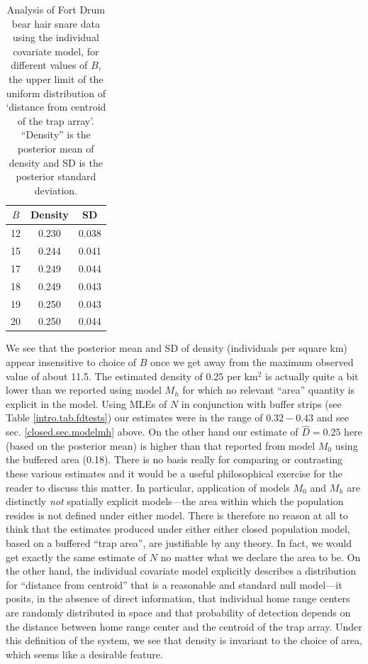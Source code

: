 \begin{table}[htp]
\centering
\caption{Analysis of Fort Drum bear hair snare data using the
  individual covariate model, for different values of $B$, the upper
  limit of the uniform distribution of `distance from centroid of the
  trap array'. ``Density'' is the posterior mean of density and SD is
  the posterior standard deviation.}
\begin{tabular}{ccc}
\hline %
 $B$ & Density & SD \\ \hline
  12& 0.230 & 0.038 \\
  15& 0.244 &0.041 \\
  17& 0.249 &0.044 \\
  18& 0.249 &0.043\\
  19& 0.250 &0.043\\
  20& 0.250 &0.044 \\
\hline
\end{tabular}
\label{closed.tab.Dmax}
\end{table}


We see that the posterior mean and SD of density (individuals per
square km) appear insensitive to choice of $B$ once we get away from the maximum observed value of about 11.5. The estimated
density of 0.25 per km$^2$ is actually quite a bit lower than we
reported using model $M_h$ for which no relevant ``area'' quantity is
explicit in the model.  Using MLEs of $N$ in conjunction with buffer
strips (see Table \ref{intro.tab.fdtests}) our estimates were in the
range of $0.32-0.43$ and see sec.  \ref{closed.sec.modelmh} above.  On
the other hand our estimate of $\hat{D} = 0.25$ here (based on the
posterior mean) is higher than that reported from model $M_0$ using
the buffered area (0.18). There is no basis really for comparing or
contrasting these various estimates and it would be a useful
philosophical exercise for the reader to discuss this matter. In
particular, application of models $M_0$ and $M_h$ are distinctly {\it
  not} spatially explicit models---the area within which the
population resides is not defined under either model. There is
therefore no reason at all to think that the estimates produced under
either either closed population model, based on a buffered ``trap
area'', are justifiable by any theory. In fact, we would get exactly
the same estimate of $N$ no matter what we declare the area to be. On
the other hand, the individual covariate model explicitly describes a
distribution for ``distance from centroid'' that is a reasonable and
standard null model---it posits, in the absence of direct information,
that individual home range centers are randomly distributed in space
and that probability of detection depends on the distance between home
range center and the centroid of the trap array. Under this definition
of the system, we see that density is invariant to the choice of area,
which seems like a desirable feature.


